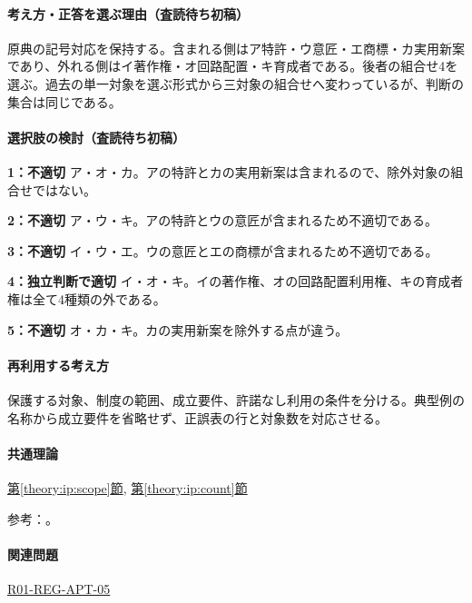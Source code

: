 \paragraph{考え方・正答を選ぶ理由（査読待ち初稿）} 原典の記号対応を保持する。含まれる側はア特許・ウ意匠・エ商標・カ実用新案であり、外れる側はイ著作権・オ回路配置・キ育成者である。後者の組合せ4を選ぶ。過去の単一対象を選ぶ形式から三対象の組合せへ変わっているが、判断の集合は同じである。

\paragraph{選択肢の検討（査読待ち初稿）}\mbox{}\par

\noindent\textbf{1：不適切} ア・オ・カ。アの特許とカの実用新案は含まれるので、除外対象の組合せではない。\par

\noindent\textbf{2：不適切} ア・ウ・キ。アの特許とウの意匠が含まれるため不適切である。\par

\noindent\textbf{3：不適切} イ・ウ・エ。ウの意匠とエの商標が含まれるため不適切である。\par

\noindent\textbf{4：独立判断で適切} イ・オ・キ。イの著作権、オの回路配置利用権、キの育成者権は全て4種類の外である。\par

\noindent\textbf{5：不適切} オ・カ・キ。カの実用新案を除外する点が違う。\par

\paragraph{再利用する考え方} 保護する対象、制度の範囲、成立要件、許諾なし利用の条件を分ける。典型例の名称から成立要件を省略せず、正誤表の行と対象数を対応させる。

\paragraph{共通理論} \hyperref[theory:ip:scope]{第\ref*{theory:ip:scope}節}, \hyperref[theory:ip:count]{第\ref*{theory:ip:count}節}

\par 参考：\cite{ip_industrial_four,ip_broad_scope}。

\paragraph{関連問題} \hyperref[q:r01-reg-apt-05]{R01-REG-APT-05}

